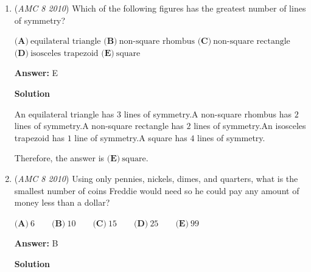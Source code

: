 \begin{enumerate}
 The ceiling is $240$ centimeters above the floor. The combined height of Alice and the light bulb when she reaches for it is $10+150+46=206$ centimeters. That means the stool's height needs to be $240-206=\boxed{\textbf{(B)}\ 34}$




\textbf{Solution 2}

Convert everything to the same unit. Since the answer is in centimeters, change meters to centimeters by multiplying by 100. 

 So, the ceiling is $240$ centimeters above the floor. $10$ cm below means the light is at $230$ cm. Because Alice is $150$ cm, and she can reach $46$ cm \textbf{ above her head }, her reach height is $46+150=196$. The height of the stool is the difference of the heights; $230-196=34$ cm.

 -N.

 


	\item (\textit{AMC 8 2010}) Which of the following figures has the greatest number of lines of symmetry? 


 $\textbf{(A)}\ \text{equilateral triangle}$
$\textbf{(B)}\ \text{non-square rhombus}$
$\textbf{(C)}\ \text{non-square rectangle}$
$\textbf{(D)}\ \text{isosceles trapezoid}$
$\textbf{(E)}\ \text{square}$

 \textbf{Answer: }E



\textbf{Solution}

An equilateral triangle has $3$ lines of symmetry.A non-square rhombus has $2$ lines of symmetry.A non-square rectangle has $2$ lines of symmetry.An isosceles trapezoid has $1$ line of symmetry.A square has $4$ lines of symmetry.

 
Therefore, the answer is $\boxed{ \textbf{(E)}\ \text{square} }$.

 


 


	\item (\textit{AMC 8 2010}) Using only pennies, nickels, dimes, and quarters, what is the smallest number of coins Freddie would need so he could pay any amount of money less than a dollar? 


 $\textbf{(A)}\ 6 \qquad\textbf{(B)}\ 10\qquad\textbf{(C)}\ 15\qquad\textbf{(D)}\ 25\qquad\textbf{(E)}\ 99$

 \textbf{Answer: }B



\textbf{Solution}


\end{enumerate}
